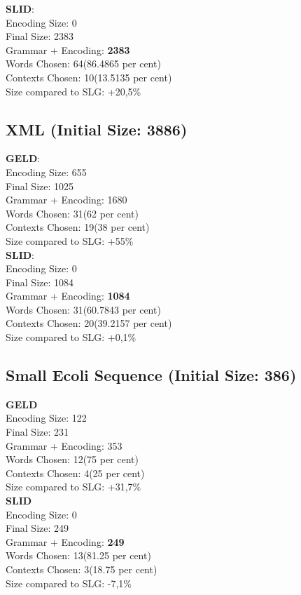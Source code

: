 \textbf{SLID}:\\
Encoding Size: 0 \\
Final Size: 2383 \\
Grammar + Encoding: \textbf{2383} \\
Words Chosen: 64(86.4865 per cent) \\
Contexts Chosen: 10(13.5135 per cent) \\
Size compared to SLG:  +20,5\% \\



\subsection{XML (Initial Size: 3886)}
\textbf{GELD}: \\
Encoding Size: 655 \\
Final Size: 1025 \\
Grammar + Encoding: 1680 \\
Words Chosen: 31(62 per cent) \\
Contexts Chosen: 19(38 per cent) \\
Size compared to SLG:  +55\% \\

\textbf{SLID}:\\
Encoding Size: 0 \\
Final Size: 1084 \\
Grammar + Encoding: \textbf{1084} \\
Words Chosen: 31(60.7843 per cent) \\
Contexts Chosen: 20(39.2157 per cent) \\
Size compared to SLG:  +0,1\% \\


\subsection{Small Ecoli Sequence (Initial Size: 386)}
\textbf{GELD}  \\
Encoding Size: 122\\
Final Size: 231\\ 
Grammar + Encoding: 353 \\
Words Chosen: 12(75 per cent) \\ 
Contexts Chosen: 4(25 per cent) \\
Size compared to SLG:  +31,7\% \\

\textbf{SLID} \\
Encoding Size: 0 \\
Final Size: 249 \\
Grammar + Encoding: \textbf{249} \\
Words Chosen: 13(81.25 per cent) \\
Contexts Chosen: 3(18.75 per cent) \\
Size compared to SLG:  -7,1\% \\


